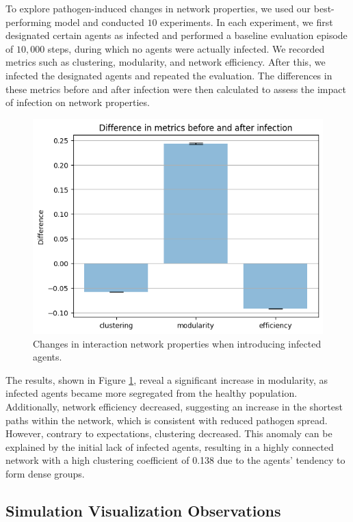\documentclass[9pt]{IEEEtran}
\begin{document}
To explore pathogen-induced changes in network properties, we used our best-performing model and conducted $10$ experiments. In each experiment, we first designated certain agents as infected and performed a baseline evaluation episode of $10,000$ steps, during which no agents were actually infected. We recorded metrics such as clustering, modularity, and network efficiency. After this, we infected the designated agents and repeated the evaluation. The differences in these metrics before and after infection were then calculated to assess the impact of infection on network properties.

\begin{figure}[hbt]
    \centering
    \includegraphics[width=0.9\linewidth]{figures/induced_changes.png}
    \caption{Changes in interaction network properties when introducing infected agents.}
    \label{fig:induced_changes}
\end{figure}

The results, shown in Figure \ref{fig:induced_changes}, reveal a significant increase in modularity, as infected agents became more segregated from the healthy population. Additionally, network efficiency decreased, suggesting an increase in the shortest paths within the network, which is consistent with reduced pathogen spread. However, contrary to expectations, clustering decreased. This anomaly can be explained by the initial lack of infected agents, resulting in a highly connected network with a high clustering coefficient of 0.138 due to the agents’ tendency to form dense groups.

\subsection{Simulation Visualization Observations}
\end{document}
